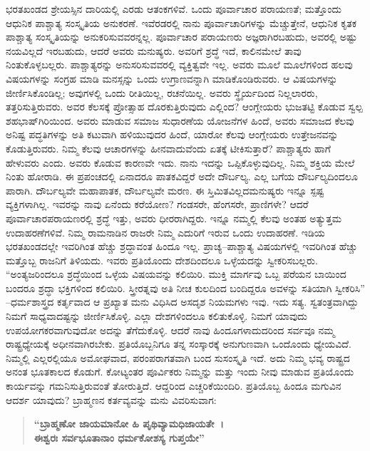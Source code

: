 ಭರತಖಂಡದ ಶ್ರೇಯಸ್ಸಿನ ದಾರಿಯಲ್ಲಿ ಎರಡು ಆತಂಕಗಳಿವೆ. ಒಂದು ಪೂರ್ವಾಚಾರ ಪರಾಯಣತೆ; ಮತ್ತೊಂದು ಆಧುನಿಕ ಪಾಶ್ಚಾತ್ಯ ಸಂಸ್ಕೃತಿಯ ಅನುಕರಣೆ. ಇವೆರಡರಲ್ಲಿ ನಾನು ಪೂರ್ವಾಚಾರಿಗಳನ್ನು ಮೆಚ್ಚುತ್ತೇನೆ, ಆಧುನಿಕ ಕೃತಕ ಪಾಶ್ಚಾತ್ಯ ಸಂಸ್ಕೃತಿಯನ್ನು ಅನುಕರಿಸುವವರನ್ನಲ್ಲ. ಪೂರ್ವಾಚಾರ ಪರಾಯಣರು ಅಜ್ಞರಾಗಿರಬಹುದು, ಅವರಲ್ಲಿ ಅಷ್ಟು ನಯವಿಲ್ಲದೆ ಇರಬಹುದು, ಆದರೆ ಅವರು ಮನುಷ್ಯರು. ಅವರಿಗೆ ಶ್ರದ್ಧೆ ಇದೆ, ಕಾಲಿನಮೇಲೆ ತಾವು ನಿಂತುಕೊಳ್ಳಬಲ್ಲರು. ಪಾಶ್ಚಾತ್ಯರನ್ನು ಅನುಸರಿಸುವವರಲ್ಲಿ ವ್ಯಕ್ತಿತ್ವವೇ ಇಲ್ಲ. ಅವರು ಮೂಲೆ ಮೂಲೆಗಳಿಂದ ಹಲವು ವಿಷಯಗಳನ್ನು ಸಂಗ್ರಹ ಮಾಡಿ ಮನಸ್ಸನ್ನು ಒಂದು ಉಗ್ರಾಣವನ್ನಾಗಿ ಮಾಡಿಕೊಂಡಿರುವರು. ಆ ವಿಷಯಗಳನ್ನು ಜೀರ್ಣಿಸಿಕೊಂಡಿಲ್ಲ; ಅವುಗಳಲ್ಲಿ ಒಂದು ರೀತಿಯಿಲ್ಲ, ರಚನೆಯಿಲ್ಲ. ಅವರು ಸ್ಥೈರ್ಯದಿಂದ ನಿಲ್ಲಲಾರರು, ತತ್ತರಿಸುತ್ತಿರುವರು. ಅವರ ಕೆಲಸಕ್ಕೆ ಪ್ರೋತ್ಸಾಹ ದೊರಕುತ್ತಿರುವುದು ಎಲ್ಲಿಂದ? ಆಂಗ್ಲೇಯರು ಭುಜತಟ್ಟಿ ಕೊಡುವ ಸ್ವಲ್ಪ ಶಹಭಾಷ್​ಗಿರಿಯಿಂದ. ಅವರು ಮಾಡುವ ಸಮಾಜ ಸುಧಾರಣೆಯ ಯೋಜನೆಗಳ ಹಿಂದೆ, ಅವರು ಸಮಾಜದ ಕೆಲವು ಅನಿಷ್ಟ ಪದ್ಧತಿಗಳನ್ನು ಅತಿ ಕಟುವಾಗಿ ಹಳಿಯುವುದರ ಹಿಂದೆ, ಯಾರೋ ಕೆಲವು ಆಂಗ್ಲೇಯರು ಉತ್ತೇಜನವನ್ನು ಕೊಡುತ್ತಿರುವರು. ನಿಮ್ಮ ಕೆಲವು ಆಚಾರಗಳನ್ನು ಹೀನವಾದುವೆಂದು ಏತಕ್ಕೆ ಟೀಕಿಸುತ್ತಾರೆ? ಪಾಶ್ಚಾತ್ಯರು ಹಾಗೆ ಹೇಳುವರು ಎಂದು. ಅವರು ಕೊಡುವ ಕಾರಣವೇ ಇದು. ನಾನು ಇದನ್ನು ಒಪ್ಪಿಕೊಳ್ಳುವುದಿಲ್ಲ. ನಿಮ್ಮ ಶಕ್ತಿಯ ಮೇಲೆ ನಿಂತು ಹೋರಾಡಿ. ಈ ಪ್ರಪಂಚದಲ್ಲಿ ಏನಾದರೂ ಪಾತಕವಿದ್ದರೆ ಅದೇ ದೌರ್ಬಲ್ಯ. ಎಲ್ಲ ಬಗೆಯ ದೌರ್ಬಲ್ಯದಿಂದಲೂ ಪಾರಾಗಿ. ದೌರ್ಬಲ್ಯವೇ ಮಹಾಪಾತಕ, ದೌರ್ಬಲ್ಯವೇ ಮರಣ. ಈ ಸ್ತಿಮಿತವಿಲ್ಲದ\break ಮನುಷ್ಯರು ಇನ್ನೂ ಸ್ಪಷ್ಟ ವ್ಯಕ್ತಿಗಳಾಗಿಲ್ಲ. ಇವರನ್ನು ನಾವು ಏನೆಂದು ಕರೆಯೋಣ? ಗಂಡಸರೇ, ಹೆಂಗಸರೇ, ಪ್ರಾಣಿಗಳೇ? ಆದರೆ ಪೂರ್ವಾಚಾರಪರಾಯಣರಲ್ಲಿ ಶ್ರದ್ಧೆ ಇತ್ತು, ಅವರು ಧೀರರಾಗಿದ್ದರು. ಇನ್ನೂ ನಮ್ಮಲ್ಲಿ ಕೆಲವು ಅಂತಹ ಅತ್ಯುತ್ತಮ ಉದಾಹರಣೆಗಳಿವೆ. ನಿಮ್ಮ ರಾಮನಾಡಿನ ರಾಜರೇ ನಿಮ್ಮ ಎದುರಿಗೆ ಇರುವ ಒಂದು ಉದಾಹರಣೆ. ಇಡಿಯ ಭರತಖಂಡದಲ್ಲೇ ಇವರಿಗಿಂತ ಹೆಚ್ಚು ಶ್ರದ್ಧಾವಂತ ಹಿಂದೂ ಇಲ್ಲ. ಪ್ರಾಚ್ಯ–ಪಾಶ್ಚಾತ್ಯ ವಿಷಯಗಳಲ್ಲಿ ಇವರಿಗಿಂತ ಹೆಚ್ಚು ಮತ್ತೊಬ್ಬ ರಾಜನಿಗೆ ತಿಳಿಯದು. ಇವರು ಪ್ರತಿಯೊಂದು ದೇಶದಿಂದಲೂ ಒಳ್ಳೆಯದನ್ನು ಸ್ವೀಕರಿಸಬಲ್ಲರು. “ಅಂತ್ಯಜರಿಂದಲೂ ಶ್ರದ್ಧೆಯಿಂದ ಒಳ್ಳೆಯ ವಿಷಯವನ್ನು ಕಲಿಯಿರಿ. ಮುಕ್ತಿ ಮಾರ್ಗವು ಒಬ್ಬ ಪರೆಯನ ಬಾಯಿಂದ ಬಂದರೂ ಶ್ರದ್ಧಾ ಭಕ್ತಿಗಳಿಂದ ಕಲಿಯಿರಿ. ಸ್ತ್ರೀರತ್ನವು ಅತಿ ನೀಚ ಕುಲದಿಂದ ಬಂದಿದ್ದರೂ ಅವಳನ್ನು ಸತಿಯಾಗಿ ಸ್ವೀಕರಿಸಿ” –ಧರ್ಮಶಾಸ್ತ್ರದ ಕರ್ತೃವಾದ ಆ ಪ್ರಖ್ಯಾತ ಮನು ವಿಧಿಸಿದ ಅಸದೃಶ ನಿಯಮಗಳು ಇವು. ಇದು ಸತ್ಯ. ಸ್ವತಂತ್ರವಾಗಿದ್ದು ನಿಮಗೆ ಸಾಧ್ಯವಾದಷ್ಟನ್ನು ಜೀರ್ಣಿಸಿಕೊಳ್ಳಿ. ಎಲ್ಲಾ ದೇಶಗಳಿಂದಲೂ ಕಲಿತುಕೊಳ್ಳಿ. ನಿಮಗೆ ಯಾವುದು ಉಪಯೋಗಕರವಾಗುವುದೋ ಅದನ್ನು ತೆಗೆದುಕೊಳ್ಳಿ. ಆದರೆ ನಾವು ಹಿಂದೂಗಳಾದುದರಿಂದ ಸರ್ವವೂ ನಮ್ಮ ರಾಷ್ಟ್ರಧ್ಯೇಯಕ್ಕೆ ಅಧೀನವಾಗಿರಬೇಕು. ಪ್ರತಿಯೊಬ್ಬನಿಗೂ ತನ್ನ ಸಂಸ್ಕಾರಕ್ಕೆ ಅನುಗುಣವಾಗಿ ಒಂದೊಂದು ಧ್ಯೇಯವಿದೆ. ನಿಮ್ಮಲ್ಲಿ ಎಲ್ಲರಲ್ಲಿಯೂ ಅಮೋಘವಾದ, ಪರಂಪರಾಗತವಾಗಿ ಬಂದ ಸುಸಂಸ್ಕೃತಿ ಇದೆ. ಅದು ನಿಮ್ಮ ಭವ್ಯ ರಾಷ್ಟ್ರದ ಅನಂತ ಭೂತಕಾಲದ ಕೊಡುಗೆ. ಕೋಟ್ಯಂತರ ಪೂರ್ವಿಕರು ನಿಮ್ಮನ್ನು ಮತ್ತು ಇಂದು ನೀವು ಮಾಡುವ ಪ್ರತಿಯೊಂದು ಕಾರ್ಯವನ್ನು ಗಮನಿಸುತ್ತಿರುವಂತೆ ತೋರುತ್ತಿದೆ. ಆದ್ದರಿಂದ ಎಚ್ಚರಿಕೆಯಿಂದಿರಿ. ಪ್ರತಿಯೊಬ್ಬ ಹಿಂದೂ ಮಗುವಿನ ಆದರ್ಶ ಯಾವುದು? ಬ್ರಾಹ್ಮಣನ ಕರ್ತವ್ಯವನ್ನು ಮನು ವಿವರಿಸುವಾಗ:

\begin{verse}
\textbf{“ಬ್ರಾಹ್ಮಣೋ ಜಾಯಮಾನೋ ಹಿ ಪೃಥಿವ್ಯಾಮಧಿಜಾಯತೇ~।}\\\textbf{ಈಶ್ವರಃ ಸರ್ವಭೂತಾನಾಂ ಧರ್ಮಕೋಶಸ್ಯ ಗುಪ್ತಯೇ”}
\end{verse}

